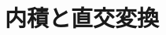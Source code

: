\documentclass[../../topic_linear-algebra]{subfiles}
\begin{document}
\chapter{内積と直交変換}

\end{document}
